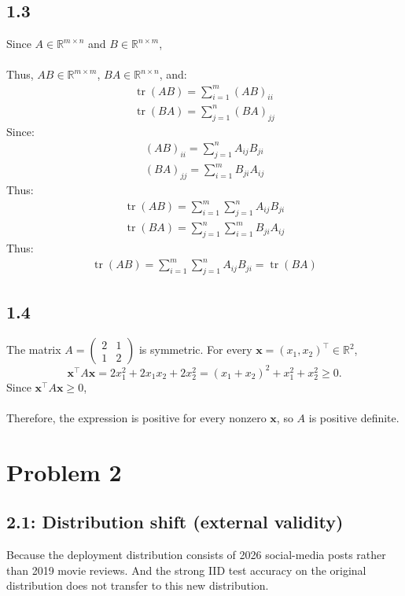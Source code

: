 \subsection*{1.3}
Since $A\in\mathbb{R}^{m\times n}$ and $B\in\mathbb{R}^{n\times m}$,\\\\
Thus, $AB\in\mathbb{R}^{m\times m}$, $BA\in\mathbb{R}^{n\times n}$, and:\\
\begin{align*}
\operatorname{tr}(AB)
=\sum_{i=1}^{m}(AB)_{ii}\\
\operatorname{tr}(BA)
=\sum_{j=1}^{n}(BA)_{jj}
\end{align*}
Since: 
\begin{align*}
(AB)_{ii}
=\sum_{j=1}^{n}A_{ij}B_{ji}\\
(BA)_{jj}
=\sum_{i=1}^{m}B_{ji}A_{ij}
\end{align*}
Thus: 
\begin{align*}
\operatorname{tr}(AB)
=\sum_{i=1}^{m}\sum_{j=1}^{n}A_{ij}B_{ji}\\
\operatorname{tr}(BA)
=\sum_{j=1}^{n}\sum_{i=1}^{m}B_{ji}A_{ij}
\end{align*}
Thus:
\begin{align*}
\operatorname{tr}(AB)
=\sum_{i=1}^{m}\sum_{j=1}^{n}A_{ij}B_{ji}
=\operatorname{tr}(BA)
\end{align*}

\subsection*{1.4}
The matrix $A=\left(\begin{smallmatrix}2&1\\1&2\end{smallmatrix}\right)$ is symmetric. For every $\mathbf{x}=(x_1,x_2)^{\top}\in\mathbb{R}^2$,
\[
\mathbf{x}^{\top}A\mathbf{x}=2x_1^2+2x_1x_2+2x_2^2
=(x_1+x_2)^2+x_1^2+x_2^2\ge0.
\]
Since $\mathbf{x}^{\top}A\mathbf{x}\ge0$,\\\\
Therefore, the expression is positive for every nonzero $\mathbf{x}$, so $A$ is positive definite.

\clearpage
\section*{Problem 2}

\subsection*{2.1: Distribution shift (external validity)}
Because the deployment distribution consists of 2026 social-media posts rather than 2019 movie reviews. And the strong IID test accuracy on the original distribution does not transfer to this new distribution.


